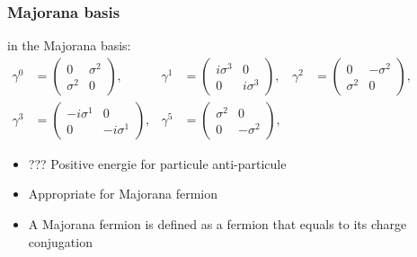 \begin{frame}\frametitle{Majorana basis}
in the Majorana basis:\\


${\displaystyle {\begin{aligned}\gamma ^{0}&={\begin{pmatrix}0&\sigma ^{2}\\\sigma ^{2}&0\end{pmatrix}},&\gamma ^{1}&={\begin{pmatrix}i\sigma ^{3}&0\\0&i\sigma ^{3}\end{pmatrix}},&\gamma ^{2}&={\begin{pmatrix}0&-\sigma ^{2}\\\sigma ^{2}&0\end{pmatrix}},\\\gamma ^{3}&={\begin{pmatrix}-i\sigma ^{1}&0\\0&-i\sigma ^{1}\end{pmatrix}},&\gamma ^{5}&={\begin{pmatrix}\sigma ^{2}&0\\0&-\sigma ^{2}\end{pmatrix}},\end{aligned}}}$
\\

\begin{itemize}
 \item  ??? Positive energie for particule anti-particule
 \item  Appropriate for Majorana fermion  
\item  A Majorana fermion is defined as a fermion that equals to its charge conjugation
\end{itemize}

\end{frame}
